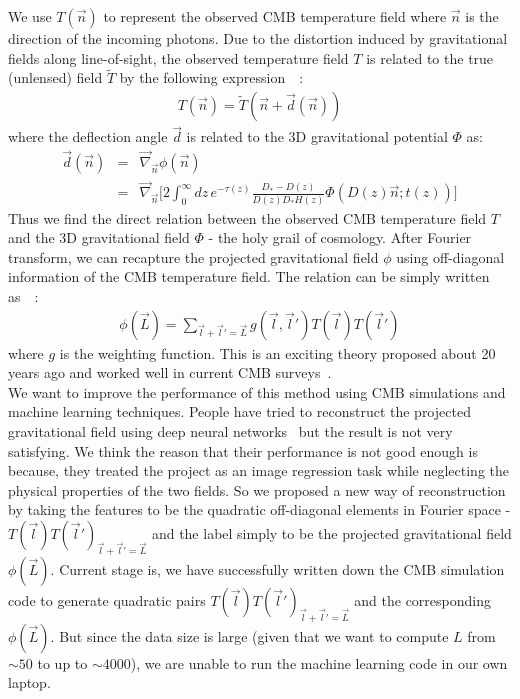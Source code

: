 \documentclass[12pt]{article}
\begin{document}
\begin{small}
We use $T(\vec{n})$ to represent the observed CMB temperature field where $\vec{n}$ is the direction of the incoming photons. Due to the distortion induced by gravitational fields along line-of-sight, the observed temperature field $T$ is related to the true (unlensed) field $\tilde{T}$ by the following expression~\cite{Hu:2001tn}~\cite{Li:2019qkp}:
\begin{eqnarray}
T(\vec{n})=\tilde{T}(\vec{n}+\vec{d}(\vec{n}))
\end{eqnarray}
where the deflection angle $\vec{d}$ is related to the 3D gravitational potential $\Phi$ as:
\begin{eqnarray}
\vec{d}(\vec{n})&=& \vec{\nabla}_{\vec{n}} {\phi}(\vec{n})\nonumber \\
&=&\vec{\nabla}_{\vec{n}}\bigg[ 2\int_{0}^{\infty} dz\, e^{-\tau(z)}\frac{D_{*}-D(z)}{D(z)D_{*}H(z)}\Phi(D(z)\vec{n};t(z)) \bigg]
\end{eqnarray}
Thus we find the direct relation between the observed CMB temperature field $T$ and the 3D gravitational field $\Phi$ - the holy grail of cosmology. After Fourier transform, we can recapture the projected gravitational field $\phi$ using off-diagonal information of the CMB temperature field. The relation can be simply written as~\cite{Hu:2001kj}~\cite{Okamoto:2003zw}:
\begin{eqnarray}
\phi(\vec{L}) = \sum_{\vec{l}+\vec{l}'=\vec{L}}g(\vec{l},\vec{l}')  T(\vec{l})T(\vec{l}')
\end{eqnarray}
where $g$ is the weighting function. This is an exciting theory proposed about 20 years ago and worked well in current CMB surveys~\cite{Aghanim:2018oex}. \\
We want to improve the performance of this method using CMB simulations and machine learning techniques. People have tried to reconstruct the projected gravitational field using deep neural networks~\cite{Caldeira:2018ojb} but the result is not very satisfying. We think the reason that their performance is not good enough is because, they treated the project as an image regression task while neglecting the physical properties of the two fields. So we proposed a new way of reconstruction by taking the features to be the quadratic off-diagonal elements in Fourier space - $T(\vec{l})T(\vec{l}')_{\vec{l}+\vec{l}'=\vec{L}}$ and the label simply to be the projected gravitational field $\phi(\vec{L})$. Current stage is, we have successfully written down the CMB simulation code to generate quadratic pairs $T(\vec{l})T(\vec{l}')_{\vec{l}+\vec{l}'=\vec{L}}$ and the corresponding $\phi(\vec{L})$. But since the data size is large (given that we want to compute $L$ from $\sim 50$ to up to $\sim 4000$), we are unable to run the machine learning code in our own laptop.


\end{small}
\end{document}
